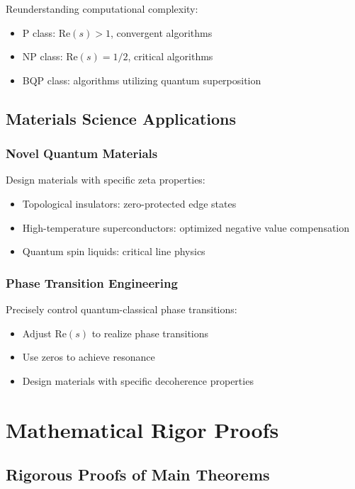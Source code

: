 \documentclass[11pt]{article}
\theoremstyle{plain}
\theoremstyle{definition}
\theoremstyle{remark}
\begin{document}
Reunderstanding computational complexity:
\begin{itemize}
\item P class: $\text{Re}(s) > 1$, convergent algorithms
\item NP class: $\text{Re}(s) = 1/2$, critical algorithms
\item BQP class: algorithms utilizing quantum superposition
\end{itemize}

\subsection{Materials Science Applications}

\subsubsection{Novel Quantum Materials}

Design materials with specific zeta properties:
\begin{itemize}
\item Topological insulators: zero-protected edge states
\item High-temperature superconductors: optimized negative value compensation
\item Quantum spin liquids: critical line physics
\end{itemize}

\subsubsection{Phase Transition Engineering}

Precisely control quantum-classical phase transitions:
\begin{itemize}
\item Adjust $\text{Re}(s)$ to realize phase transitions
\item Use zeros to achieve resonance
\item Design materials with specific decoherence properties
\end{itemize}

\section{Mathematical Rigor Proofs}

\subsection{Rigorous Proofs of Main Theorems}
\end{document}
